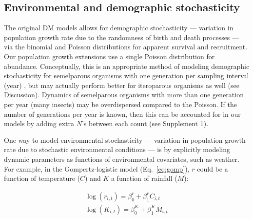 \documentclass[12pt,english]{article}
\begin{document}
\begin{spacing}{1.9}
\begin{flushleft}
\subsection*{Environmental and demographic stochasticity}

The original DM models allows for demographic stochasticity --- variation in population growth 
rate due to the randomness of birth and death processes --- 
via the binomial and Poisson distributions for apparent survival and recruitment.  Our population
growth extensions use a single Poisson distribution for abundance. 
Conceptually, this is an appropriate method of modeling demographic stochasticity 
for semelparous organisms with one generation per sampling interval (year)
\citep{bonsall_hastings:2004,melbourne_hastings:2008},
but may actually perform better for iteroparous organisms as well (see Discussion).  
Dynamics of semelparous organisms with more than one generation per year 
(many insects) may be overdispersed compared to the Poisson.  If the number of generations per
year is known, then this can be accounted for in our models by adding extra $N$'s between each
count (see Supplement 1).

One way to model environmental stochasticity --- variation in population growth
rate due to stochastic environmental conditions --- is by explicitly
modeling dynamic parameters as functions of environmental covariates, such
as weather.  For example, in the Gompertz-logistic model (Eq.~\ref{eq:gomp}), $r$ could be a 
function of temperature ($C$) and $K$ a function of rainfall ($M$):
\begin{linenomath*}
\begin{gather}
\log(r_{i,t}) = \beta^{r}_{0} + \beta^{r}_{1}C_{i,t} \nonumber \\
\log(K_{i,t}) = \beta^{K}_{0} + \beta^{K}_{1}M_{i,t}  
\label{eq:weather}
\end{gather}
\end{linenomath*}


\end{flushleft}
\end{spacing}
\end{document}
